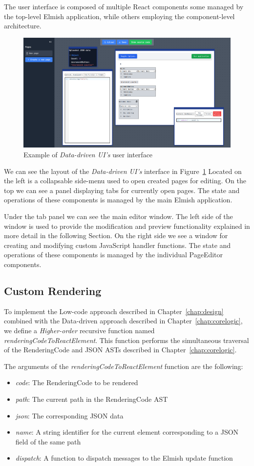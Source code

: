 The user interface is composed of multiple React components some managed by the top-level Elmish application, while others employing the
component-level architecture.
\begin{figure}[H]
	\centering
	\includegraphics[width=1\linewidth]{img/UIExample.pdf}
	\caption{Example of \emph{Data-driven UI's} user interface}
	\label{fig:ui}
\end{figure}
We can see the layout of the \emph{Data-driven UI's} interface in Figure~\ref{fig:ui}
Located on the left is a collapsable side-menu used to open created pages for editing.
On the top we can see a panel displaying tabs for currently open pages.
The state and operations of these components is managed by the main Elmish application.

Under the tab panel we can see the main editor window.
The left side of the window is used to provide the modification and preview functionality explained in more detail in the following Section.
On the right side we see a window for creating and modifying custom JavaScript handler functions.
The state and operations of these components is managed by the individual PageEditor components.

\subsection{Custom Rendering}

To implement the Low-code approach described in Chapter~\ref{chap:design} combined with the Data-driven approach described in Chapter~\ref{chap:corelogic},
we define a \emph{Higher-order} recursive function named \emph{renderingCodeToReactElement}.
This function performs the simultaneous traversal of the RenderingCode and JSON ASTs described in Chapter~\ref{chap:corelogic}.

The arguments of the \emph{renderingCodeToReactElement} function are the following:
\begin{itemize}
	\item \emph{code}: The RenderingCode to be rendered
	\item \emph{path}: The current path in the RenderingCode AST
	\item \emph{json}: The corresponding JSON data
	\item \emph{name}: A string identifier for the current element corresponding to a JSON field of the same path
	\item \emph{dispatch}: A function to dispatch messages to the Elmish update function
\end{itemize}

